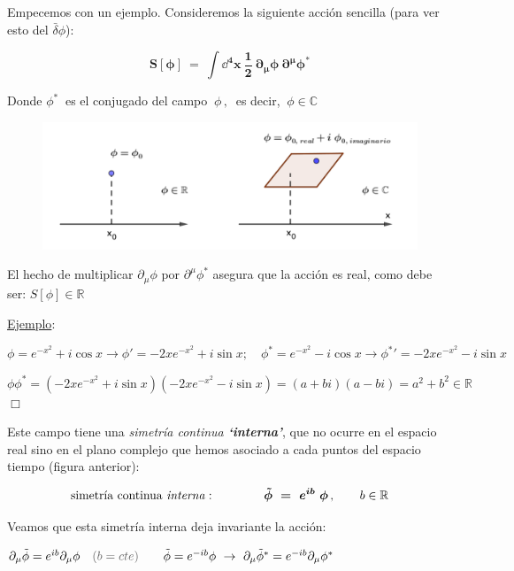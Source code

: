 Empecemos con un ejemplo. Consideremos la siguiente acción sencilla (para ver esto del $\bar \delta \phi$):

$$\boldsymbol{ S[\phi] \ = \ \displaystyle \int \dd^4 x\ \dfrac 1 2 \ \partial_\mu \phi \ \partial^\mu \phi^*}$$

Donde $ \phi^* \ $  es el conjugado del campo $\ \phi \, , \  $  es decir, $\ \phi \in \mathbb C$


\begin{figure}[H]
	\centering
	\includegraphics[width=.75\textwidth]{imagenes/img35-01.png}
\end{figure}

El hecho de  multiplicar $\partial_\mu \phi$ por $\partial^\mu \phi^*$ asegura que la acción es real, como debe ser: $S[\phi] \in \mathbb R$

\color{gris}
\underline{Ejemplo}: 

\vspace{-5mm}
\hspace{2 cm} $\phi=e^{-x^2}+i\cos x \to \phi'=-2xe^{-x^2}+i\sin x;\quad \phi^*=e^{-x^2}-i\cos x \to {\phi^*}'=-2xe^{-x^2}-i\sin x$

\hspace{2 cm} $\phi \phi^*=(-2xe^{-x^2}+i\sin x)(-2xe^{-x^2}-i\sin x)=(a+bi)(a-bi)=a^2+b^2\in \mathbb R$ \hspace{2.5cm}$\Box$

\color{black}

\vspace{5mm} Este campo tiene una \emph{simetría continua \textbf{`interna'}}, que no ocurre en el espacio real sino en el plano complejo que hemos asociado a cada puntos del espacio tiempo (figura anterior):

$$\text{simetría continua \emph{interna}}:\qquad \qquad \boldsymbol{ \tilde  \phi \ = \ e^{ib} \ \phi } \, , \qquad b\in \mathbb R$$

Veamos que esta simetría interna deja invariante la acción:


\hspace{1cm} $\partial_\mu \tilde \phi=e^{ib} \partial_\mu \phi\quad \textcolor{gris}{(b=cte)} \qquad \tilde \phi=e^{-ib} \phi \ \to \  \partial_\mu \tilde \phi^*=e^{-ib}\partial_\mu \phi^*$

